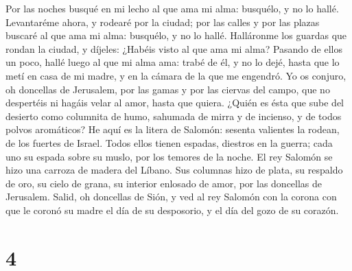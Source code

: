  Por las noches busqué en mi lecho al que ama mi alma:
busquélo, y no lo hallé.  Levantaréme ahora, y rodearé por
la ciudad; por las calles y por las plazas buscaré al que ama mi alma:
busquélo, y no lo hallé.  Halláronme los guardas que
rondan la ciudad, y díjeles: ¿Habéis visto al que ama mi alma?
 Pasando de ellos un poco, hallé luego al que mi alma ama:
trabé de él, y no lo dejé, hasta que lo metí en casa de mi madre, y en
la cámara de la que me engendró.  Yo os conjuro, oh
doncellas de Jerusalem, por las gamas y por las ciervas del campo, que
no despertéis ni hagáis velar al amor, hasta que quiera. 
¿Quién es ésta que sube del desierto como columnita de humo, sahumada de
mirra y de incienso, y de todos polvos aromáticos?  He
aquí es la litera de Salomón: sesenta valientes la rodean, de los
fuertes de Israel.  Todos ellos tienen espadas, diestros
en la guerra; cada uno su espada sobre su muslo, por los temores de la
noche.  El rey Salomón se hizo una carroza de madera del
Líbano.  Sus columnas hizo de plata, su respaldo de oro,
su cielo de grana, su interior enlosado de amor, por las doncellas de
Jerusalem.  Salid, oh doncellas de Sión, y ved al rey
Salomón con la corona con que le coronó su madre el día de su
desposorio, y el día del gozo de su corazón.

\hypertarget{section-3}{%
\section{4}\label{section-3}}

